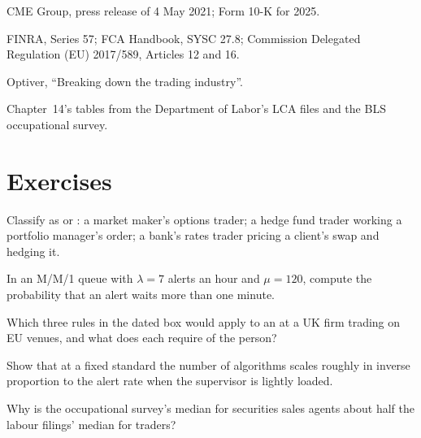 \begin{omsources}
\item CME Group, press release of 4 May 2021; Form 10-K for 2025.
\item FINRA, Series 57; FCA Handbook, SYSC 27.8; Commission Delegated Regulation (EU) 2017/589, Articles 12 and 16.
\item Optiver, ``Breaking down the trading industry''.
\item Chapter~14's tables from the Department of Labor's LCA files and the BLS occupational survey.
\end{omsources}

\section{Exercises}

\begin{exercise}[$\star$]\label{exo:in:trader:1}
Classify as  or : a market maker's options trader; a hedge fund trader working a portfolio
manager's order; a bank's rates trader pricing a client's swap and hedging it.
\end{exercise}

\begin{exercise}[$\star$]\label{exo:in:trader:2}
In an M/M/1 queue with $\lambda=7$ alerts an hour and $\mu=120$, compute the probability that an alert waits more than one
minute.
\end{exercise}

\begin{exercise}[$\star$]\label{exo:in:trader:3}
Which three rules in the dated box would apply to an  at a UK firm trading on EU venues, and what does
each require of the person?
\end{exercise}

\begin{exercise}[$\star\star$]\label{exo:in:trader:4}
Show that at a fixed standard the number of algorithms scales roughly in inverse proportion to the alert rate when the
supervisor is lightly loaded.
\end{exercise}

\begin{exercise}[$\star\star$]\label{exo:in:trader:5}
Why is the occupational survey's median for securities sales agents about half the labour filings' median for traders?
\end{exercise}

